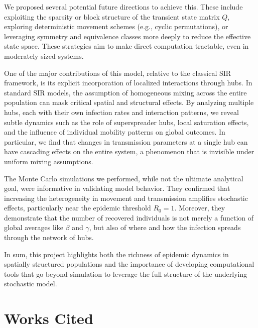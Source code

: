 \documentclass[a4paper]{article}
\begin{document}
	We proposed several potential future directions to achieve this. These include exploiting the sparsity or block structure of the transient state matrix $Q$, exploring deterministic movement schemes (e.g., cyclic permutations), or leveraging symmetry and equivalence classes more deeply to reduce the effective state space. These strategies aim to make direct computation tractable, even in moderately sized systems.
	
	One of the major contributions of this model, relative to the classical SIR framework, is its explicit incorporation of localized interactions through hubs. In standard SIR models, the assumption of homogeneous mixing across the entire population can mask critical spatial and structural effects. By analyzing multiple hubs, each with their own infection rates and interaction patterns, we reveal subtle dynamics such as the role of superspreader hubs, local saturation effects, and the influence of individual mobility patterns on global outcomes. In particular, we find that changes in transmission parameters at a single hub can have cascading effects on the entire system, a phenomenon that is invisible under uniform mixing assumptions.
	
	The Monte Carlo simulations we performed, while not the ultimate analytical goal, were informative in validating model behavior. They confirmed that increasing the heterogeneity in movement and transmission amplifies stochastic effects, particularly near the epidemic threshold $R_0=1$. Moreover, they demonstrate that the number of recovered individuals is not merely a function of global averages like $\beta$ and $\gamma$, but also of where and how the infection spreads through the network of hubs.
	
	In sum, this project highlights both the richness of epidemic dynamics in spatially structured populations and the importance of developing computational tools that go beyond simulation to leverage the full structure of the underlying stochastic model.
	
	\newpage
	\section*{Works Cited}
	
\end{document}

